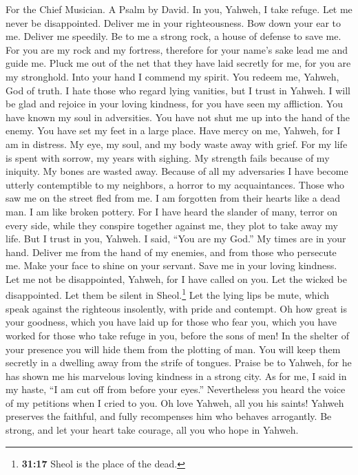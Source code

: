 For the Chief Musician. A Psalm by David.  In you, Yahweh,
I take refuge. Let me never be disappointed. Deliver me in your
righteousness.  Bow down your ear to me. Deliver me
speedily. Be to me a strong rock, a house of defense to save me.
 For you are my rock and my fortress, therefore for your
name's sake lead me and guide me.  Pluck me out of the net
that they have laid secretly for me, for you are my stronghold.
 Into your hand I commend my spirit. You redeem me,
Yahweh, God of truth.  I hate those who regard lying
vanities, but I trust in Yahweh.  I will be glad and
rejoice in your loving kindness, for you have seen my affliction. You
have known my soul in adversities.  You have not shut me
up into the hand of the enemy. You have set my feet in a large place.
 Have mercy on me, Yahweh, for I am in distress. My eye,
my soul, and my body waste away with grief.  For my life
is spent with sorrow, my years with sighing. My strength fails because
of my iniquity. My bones are wasted away.  Because of all
my adversaries I have become utterly contemptible to my neighbors, a
horror to my acquaintances. Those who saw me on the street fled from me.
 I am forgotten from their hearts like a dead man. I am
like broken pottery.  For I have heard the slander of
many, terror on every side, while they conspire together against me,
they plot to take away my life.  But I trust in you,
Yahweh. I said, ``You are my God.''  My times are in your
hand. Deliver me from the hand of my enemies, and from those who
persecute me.  Make your face to shine on your servant.
Save me in your loving kindness.  Let me not be
disappointed, Yahweh, for I have called on you. Let the wicked be
disappointed. Let them be silent in Sheol.\footnote{\textbf{31:17} Sheol
  is the place of the dead.}  Let the lying lips be mute,
which speak against the righteous insolently, with pride and contempt.
 Oh how great is your goodness, which you have laid up
for those who fear you, which you have worked for those who take refuge
in you, before the sons of men!  In the shelter of your
presence you will hide them from the plotting of man. You will keep them
secretly in a dwelling away from the strife of tongues. 
Praise be to Yahweh, for he has shown me his marvelous loving kindness
in a strong city.  As for me, I said in my haste, ``I am
cut off from before your eyes.'' Nevertheless you heard the voice of my
petitions when I cried to you.  Oh love Yahweh, all you
his saints! Yahweh preserves the faithful, and fully recompenses him who
behaves arrogantly.  Be strong, and let your heart take
courage, all you who hope in Yahweh.

